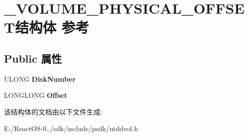 \hypertarget{struct___v_o_l_u_m_e___p_h_y_s_i_c_a_l___o_f_f_s_e_t}{}\section{\+\_\+\+V\+O\+L\+U\+M\+E\+\_\+\+P\+H\+Y\+S\+I\+C\+A\+L\+\_\+\+O\+F\+F\+S\+E\+T结构体 参考}
\label{struct___v_o_l_u_m_e___p_h_y_s_i_c_a_l___o_f_f_s_e_t}
\subsection*{Public 属性}
\begin{DoxyCompactItemize}
\item 
\mbox{\label{struct___v_o_l_u_m_e___p_h_y_s_i_c_a_l___o_f_f_s_e_t_ad88d7b8952a803001b9fc2271e9ec901}} 
U\+L\+O\+NG {\bfseries Disk\+Number}
\item 
\mbox{\label{struct___v_o_l_u_m_e___p_h_y_s_i_c_a_l___o_f_f_s_e_t_ab4ea1be23642ef9c9ea416f47fb23941}} 
L\+O\+N\+G\+L\+O\+NG {\bfseries Offset}
\end{DoxyCompactItemize}


该结构体的文档由以下文件生成\+:\begin{DoxyCompactItemize}
\item 
E\+:/\+React\+O\+S-\/0../sdk/include/psdk/ntddvol.\+h\end{DoxyCompactItemize}
